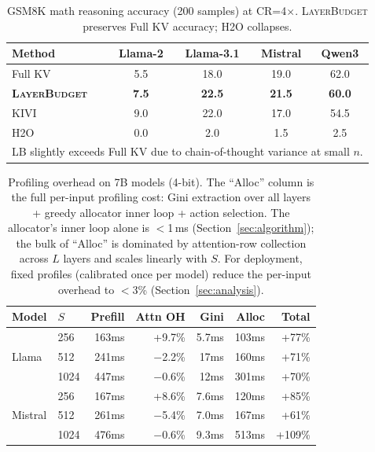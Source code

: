 \documentclass{article}
\newcommand{\layerbudget}{\textsc{LayerBudget}\xspace}
\begin{document}
\begin{table}[h]
\centering
\caption{GSM8K math reasoning accuracy (200 samples) at CR=4$\times$.
\layerbudget preserves Full KV accuracy; H2O collapses.}
\label{tab:gsm8k}
\small
\begin{tabular}{@{}lcccc@{}}
\toprule
Method & Llama-2 & Llama-3.1 & Mistral & Qwen3 \\
\midrule
Full KV              & 5.5 & 18.0 & 19.0 & 62.0 \\
\textbf{\layerbudget} & \textbf{7.5} & \textbf{22.5} & \textbf{21.5} & \textbf{60.0} \\
KIVI                 & 9.0 & 22.0 & 17.0 & 54.5 \\
H2O                  & 0.0 & 2.0 & 1.5 & 2.5 \\
\bottomrule
\multicolumn{5}{l}{\scriptsize LB slightly exceeds Full KV due to chain-of-thought variance at small $n$.}
\end{tabular}
\end{table}

\begin{table}[h]
\centering
\caption{Profiling overhead on 7B models (4-bit).
The ``Alloc'' column is the full per-input profiling cost: Gini extraction over all layers + greedy allocator inner loop + action selection.
The allocator's inner loop alone is $<$1\,ms (Section~\ref{sec:algorithm}); the bulk of ``Alloc'' is dominated by attention-row collection across $L$ layers and scales linearly with $S$.
For deployment, fixed profiles (calibrated once per model) reduce the per-input overhead to $<$3\% (Section~\ref{sec:analysis}).}
\label{tab:overhead}
\small
\setlength{\tabcolsep}{2.5pt}
\begin{tabular}{@{}llrrrrr@{}}
\toprule
Model & $S$ & Prefill & Attn OH & Gini & Alloc & Total \\
\midrule
\multirow{3}{*}{Llama}
& 256  & 163ms & +9.7\% & 5.7ms & 103ms & +77\% \\
& 512  & 241ms & $-$2.2\% & 17ms & 160ms & +71\% \\
& 1024 & 447ms & $-$0.6\% & 12ms & 301ms & +70\% \\
\midrule
\multirow{3}{*}{Mistral}
& 256  & 167ms & +8.6\% & 7.6ms & 120ms & +85\% \\
& 512  & 261ms & $-$5.4\% & 7.0ms & 167ms & +61\% \\
& 1024 & 476ms & $-$0.6\% & 9.3ms & 513ms & +109\% \\
\bottomrule
\end{tabular}
\end{table}
\end{document}
